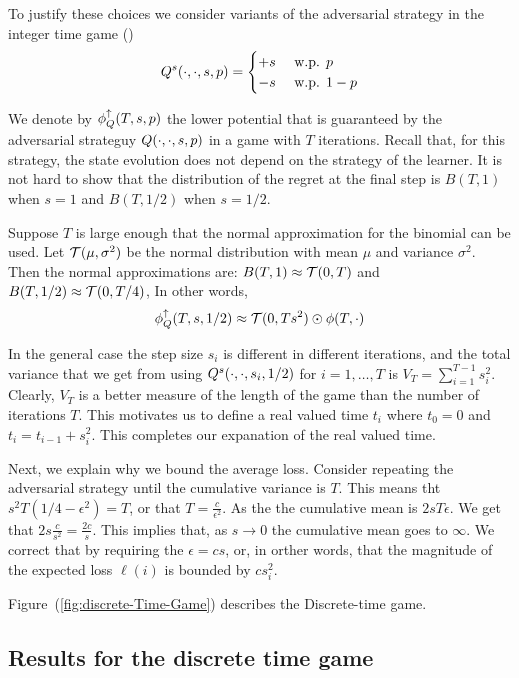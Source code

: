 \documentclass{article}[12pt]
\begin{document}
To justify these choices we consider variants of the adversarial
strategy in the integer time game (\label{eqn:adv-strat-p})
\begin{equation} \label{eqn:adv-strat-s}
  Q^s(\cdot,\cdot,s,p) =
  \begin{cases}
    +s & \mbox{ w.p. } p\\
    -s & \mbox{ w.p. } 1-p\\
  \end{cases}
\end{equation}

We denote by $\phi_{Q}^{\uparrow}(T,s,p)$ the lower potential that is guaranteed
by the adversarial strateguy $Q(\cdot,\cdot,s,p)$ in a game with
$T$ iterations. Recall that, for this strategy, the state evolution
does not depend on the strategy of the learner. It is not hard to
show that the distribution of the regret at the final step is $B(T,1)$
when $s=1$ and $B(T,1/2)$ when $s=1/2$.

Suppose $T$ is large enough that the normal approximation for the
binomial can be used. Let ${\cal T}(\mu,\sigma^2)$ be the normal
distribution with mean $\mu$ and variance $\sigma^2$. Then the normal
approximations are:
$B(T,1) \approx {\cal T}(0,T)$ and $B(T,1/2) \approx {\cal T}(0,T/4)$,
In other words,
$$\phi_{Q}^{\uparrow}(T,s,1/2) \approx {\cal T}(0,Ts^2) \odot \phi(T,\cdot)$$

In the general case the step size $s_i$ is  different in different
iterations, and the total variance that we get from using
$Q^s(\cdot,\cdot,s_i,1/2)$ for $i=1,\ldots,T$ is
$V_T=\sum_{i=1}^{T-1}s_i^2$. Clearly, $V_T$ is a better measure of the
length of the game than the number of iterations $T$. This motivates
us to define a real valued time $t_i$ where $t_0=0$ and $t_i = t_{i-1}+s_i^2$.
This completes our expanation of the real valued time.

Next, we explain why we bound the average loss. Consider repeating the
adversarial strategy until the cumulative variance is $T$.  This means
tht $s^2 T(1/4-\epsilon^2)=T$, or that $T = \frac{c}{\epsilon^2}$.
As the the cumulative mean is $2sT \epsilon$. We get that $2s
\frac{c}{s^2} =   \frac{2c}{s}$. This implies that, as $s \to 0$ the
cumulative mean goes to $\infty$. We correct that by requiring the
$\epsilon = c s$, or, in orther words, that the magnitude of the
expected loss $\ell(i)$ is bounded by $c s_i^2$.

Figure~(\ref{fig:discrete-Time-Game}) describes the Discrete-time game.


\subsection{Results for the discrete time game}
\end{document}
